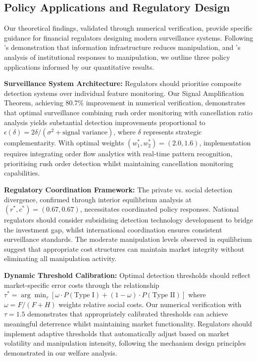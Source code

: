 \documentclass[12pt]{article}
\begin{document}
\subsection{Policy Applications and Regulatory Design}

Our theoretical findings, validated through numerical verification, provide specific guidance for financial regulators designing modern surveillance systems. Following \citet{xiong2024information}'s demonstration that information infrastructure reduces manipulation, and \citet{wang2024information}'s analysis of institutional responses to manipulation, we outline three policy applications informed by our quantitative results.

\textbf{Surveillance System Architecture:} Regulators should prioritise composite detection systems over individual feature monitoring. Our Signal Amplification Theorem, achieving 80.7\% improvement in numerical verification, demonstrates that optimal surveillance combining rush order monitoring with cancellation ratio analysis yields substantial detection improvements proportional to $\epsilon(\delta) = 2\delta/(\sigma^2 + \text{signal variance})$, where $\delta$ represents strategic complementarity. With optimal weights $(w_1^*, w_2^*) = (2.0, 1.6)$, implementation requires integrating order flow analytics with real-time pattern recognition, prioritising rush order detection whilst maintaining cancellation monitoring capabilities.

\textbf{Regulatory Coordination Framework:} The private vs. social detection divergence, confirmed through interior equilibrium analysis at $(r^*, c^*) = (0.67, 0.67)$, necessitates coordinated policy responses. National regulators should consider subsidising detection technology development to bridge the investment gap, whilst international coordination ensures consistent surveillance standards. The moderate manipulation levels observed in equilibrium suggest that appropriate cost structures can maintain market integrity without eliminating all manipulation activity.

\textbf{Dynamic Threshold Calibration:} Optimal detection thresholds should reflect market-specific error costs through the relationship $\tau^* = \arg\min_\tau [\omega \cdot P(\text{Type I}) + (1-\omega) \cdot P(\text{Type II})]$ where $\omega = F/(F+H)$ weights relative social costs. Our numerical verification with $\tau = 1.5$ demonstrates that appropriately calibrated thresholds can achieve meaningful deterrence whilst maintaining market functionality. Regulators should implement adaptive thresholds that automatically adjust based on market volatility and manipulation intensity, following the mechanism design principles demonstrated in our welfare analysis.
\end{document}
